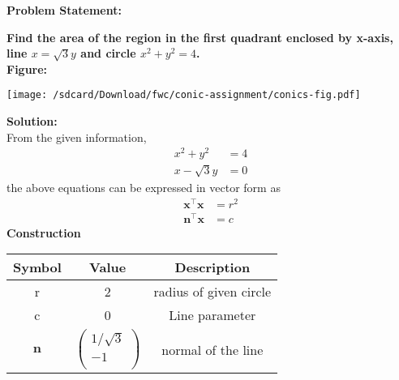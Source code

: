 \documentclass[10pt,a4paper]{report}
\let\vec\mathbf
\begin{document}
  \begin{multicols}{2}
 
 
 \raggedright \textbf{Problem Statement:} \vspace{2mm}

	  \textbf{Find the area of the region in the first quadrant enclosed by x-axis, line $x=\sqrt{3}y$ and circle $x^2+y^2=4$.} \\
	  \vspace{3mm}
\textbf{Figure:}
\raggedright 

\begin{center}
\texttt{[image: /sdcard/Download/fwc/conic-assignment/conics-fig.pdf]} 
\end{center}
	  \textbf{Solution:} \\
\vspace{0.25cm}
  From the given information,
                      \begin{align}
                              x^2 +y^2 &= 4
                              \\                                                                             
			      x - \sqrt{3}y &= 0
                    \end{align}                                                                              
		    the above equations can be expressed in vector form as      
		    \begin{align}                                                                             
		    \label{eq:cbse-2020-circ}                                                                 
		    \vec{x}^{\top}\vec{x} &= r^2               \\                                             
			    \vec{n}^{\top}\vec{x} &= c                                                         
\end{align}
	  \vspace{2mm}
\textbf{Construction}
 \vspace{0.2cm}
 \setlength\extrarowheight{2pt}
 \begin{tabular}{|c|c|c|}
         \hline
         \textbf{Symbol}&\textbf{Value}&\textbf{Description}\\
         \hline
         r & 2 & radius of given circle\\
         \hline
         c& 0 & Line parameter\\
         \hline
	 $\vec n$ & $\begin{pmatrix}1/\sqrt{3} \\ -1 \\ \end{pmatrix}$ & normal of the line\\

\end{tabular}
\end{multicols}
\end{document}
